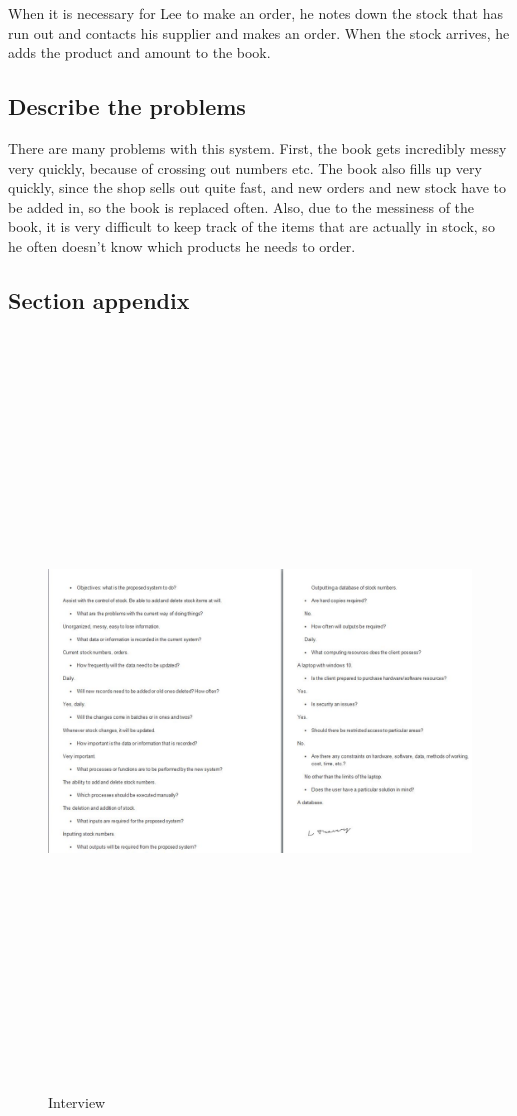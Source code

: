 When it is necessary for Lee to make an order, he notes down the stock that has run out and contacts his supplier and makes an order. When the stock arrives, he adds the product and amount to the book.

\subsection{Describe the problems}
There are many problems with this system. First, the book gets incredibly messy very quickly, because of crossing out numbers etc. The book also fills up very quickly, since the shop sells out quite fast, and new orders and new stock have to be added in, so the book is replaced often. Also, due to the messiness of the book, it is very difficult to keep track of the items that are actually in stock, so he often doesn't know which products he needs to order. 

\subsection{Section appendix}
\begin{figure}[H]
	\centering
	\includegraphics[width= 20cm, height = 20cm]{Analysis/images/interview_questions.JPG}
	\caption {Interview} \label{fig:interview_questions}
\end{figure}
